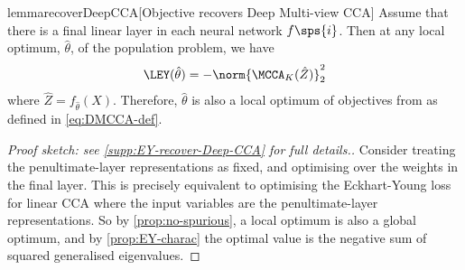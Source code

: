 \begin{restatable}{lemma}{recoverDeepCCA}[Objective recovers Deep Multi-view CCA]
    \label{lem:recover-DeepCCA}
    Assume that there is a final linear layer in each neural network $f\sps{i}$.
    Then at any local optimum, $\hat{\theta}$, of the population problem, we have
    \begin{align*}
        \LEY(\hat{\theta}) = - \norm{\MCCA_K(\hat{Z})}_2^2
    \end{align*}
    where $\hat{Z} = f_{\hat{\theta}}(X)$.
    Therefore, $\hat{\theta}$ is also a local optimum of objectives from \cite{andrew2013deep, somandepalli2019multimodal} as defined in \cref{eq:DMCCA-def}.
\end{restatable}
\begin{proof}[Proof sketch: see \cref{supp:EY-recover-Deep-CCA} for full details.]
    Consider treating the penultimate-layer representations as fixed, and optimising over the weights in the final layer. This is precisely equivalent to optimising the Eckhart-Young loss for linear CCA where the input variables are the penultimate-layer representations. So by \cref{prop:no-spurious}, a local optimum is also a global optimum, and by \cref{prop:EY-charac} the optimal value is the negative sum of squared generalised eigenvalues.
\end{proof}